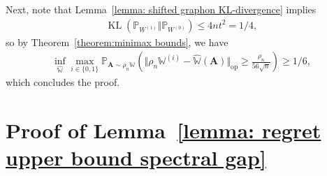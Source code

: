 \documentclass[11pt]{article}
\newcommand{\op}{\mathrm{op}}
\newcommand{\bA}{\bm{A}}
\newcommand{\bbW}{\mathbb{W}}
\newcommand{\bbP}{\mathbb{P}}
\newcommand{\KL}[2]{\operatorname{KL}\left (#1\Vert #2 \right )}
\newcommand{\<}{\langle}
\renewcommand{\>}{\rangle}
\theoremstyle{plain}
\theoremstyle{definition}
\theoremstyle{remark}
\begin{document}
{Next, note that Lemma~\ref{lemma: shifted graphon KL-divergence} implies
\begin{align}
    \KL{\bbP_{W^{(1)}}}{\bbP_{W^{(0)}}} \le 4 n t^2 = 1/4, \label{eq: KL divergence bound for smooth graphons}
\end{align}
so by Theorem~\ref{theorem:minimax bounds}, we have
\begin{align*}
    \inf_{\widehat{\bbW}} \max_{i \in \{0, 1\}} \bbP_{\bA \sim \rho_n \bbW} \left ( \Vert \rho_n \bbW^{(i)} - \widehat{\bbW}(\bA) \Vert_{\op} \ge \frac{\rho_n}{56\sqrt{n}} \right ) \ge 1/6,
\end{align*}
which concludes the proof.


\section{Proof of Lemma~\ref{lemma: regret upper bound spectral gap}}

}
\end{document}
